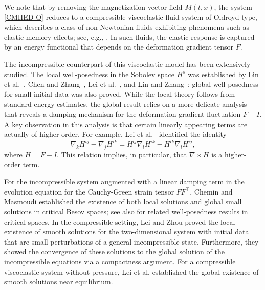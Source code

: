 \documentclass[reqno,11pt]{amsart}
\numberwithin{equation}{section}
\begin{document}
We note that by removing the magnetization vector field \(M(t,x)\), the system \eqref{CMHED-O} reduces to a compressible viscoelastic fluid system of Oldroyd type, which describes a class of non-Newtonian fluids exhibiting phenomena such as elastic memory effects; see, e.g., \cite{ref11z,ref12z,ref14z,ref18z,ref21z}. In such fluids, the elastic response is captured by an energy functional that depends on the deformation gradient tensor \(F\).

The incompressible counterpart of this viscoelastic model has been extensively studied. The local well-posedness in the Sobolev space \(H^s\) was established by Lin et al.~\cite{ref18z}, Chen and Zhang~\cite{ref6z}, Lei et al.~\cite{ref16z}, and Lin and Zhang~\cite{ref19z}; global well-posedness for small initial data was also proved. While the local theory follows from standard energy estimates, the global result relies on a more delicate analysis that reveals a damping mechanism for the deformation gradient fluctuation \(F-I\). A key observation in this analysis is that certain linearly appearing terms are actually of higher order. For example, Lei et al.~\cite{ref16z} identified the identity
\[
\nabla_{k} H^{ij}-\nabla_{j} H^{ik}=H^{lj}\nabla_{l} H^{ik}-H^{lk}\nabla_{l} H^{ij},
\]
where \(H = F - I\). This relation implies, in particular, that \(\nabla \times H\) is a higher-order term.

For the incompressible system augmented with a linear damping term in the evolution equation for the Cauchy-Green strain tensor $FF^{\top}$, Chemin and Masmoudi \cite{ref3z} established the existence of both local solutions and global small solutions in critical Besov spaces; see also \cite{ref22z} for related well-posedness results in critical spaces. In the compressible setting, Lei and Zhou \cite{ref15z} proved the local existence of smooth solutions for the two-dimensional system with initial data that are small perturbations of a general incompressible state. Furthermore, they showed the convergence of these solutions to the global solution of the incompressible equations via a compactness argument. For a compressible viscoelastic system without pressure, Lei et al. \cite{ref17z} established the global existence of smooth solutions near equilibrium.
\end{document}
